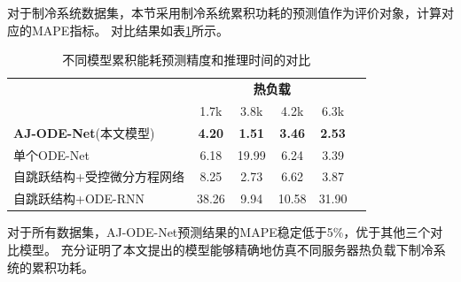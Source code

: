 对于制冷系统数据集，本节采用制冷系统累积功耗的预测值作为评价对象，计算对应的MAPE指标。
对比结果如表\ref{tab:Compare power}所示。
\begin{table}[t]
    \centering
    \caption{不同模型累积能耗预测精度和推理时间的对比}
    \begin{tabular}{lccccc} 
    \toprule
                                & \multicolumn{4}{c}{\textbf{\textbf{热负载}}} \\
    \multicolumn{1}{c}{}        & 1.7k          & 3.8k          & 4.2k          & 6.3k\\ 
    \hline
    \textbf{AJ-ODE-Net}(本文模型) & \textbf{4.20} & \textbf{1.51} & \textbf{3.46} & \textbf{2.53}            \\
    单个ODE-Net              & 6.18          & 19.99         & 6.24          & 3.39    \\
    自跳跃结构+受控微分方程网络\cite{kidger2020neural}     & 8.25         & 2.73          & 6.62         & 3.87           \\
    自跳跃结构+ODE-RNN & 38.26         & 9.94          & 10.58         & 31.90    \\
    \bottomrule
    \end{tabular}
    \label{tab:Compare power}
\end{table}
对于所有数据集，AJ-ODE-Net预测结果的MAPE稳定低于5\%，优于其他三个对比模型。
充分证明了本文提出的模型能够精确地仿真不同服务器热负载下制冷系统的累积功耗。

